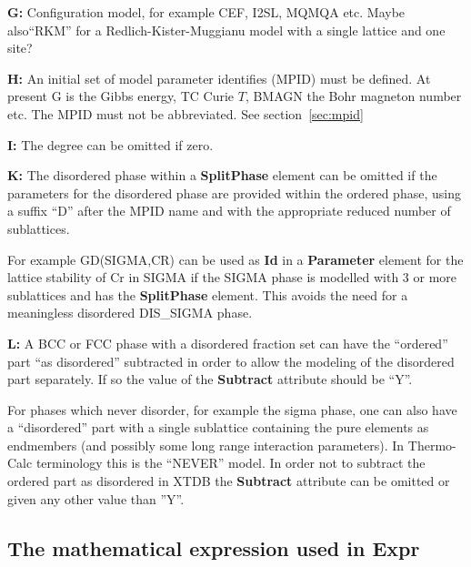\documentclass{article}
\begin{document}
\begin{description}
\item{\bf G:} Configuration model, for example CEF, I2SL, MQMQA etc.
  Maybe also``RKM'' for a Redlich-Kister-Muggianu model with a
  single lattice and one site?

\item{\bf H:} An initial set of model parameter identifies (MPID) must
  be defined.  At present G is the Gibbs energy, TC Curie $T$, BMAGN
  the Bohr magneton number etc.  The MPID must not be abbreviated.
  See section~\ref{sec:mpid}

\item{\bf I:} The degree can be omitted if zero.

\item{\bf K:} The disordered phase within a {\bf SplitPhase} element
  can be omitted if the parameters for the disordered phase are
  provided within the ordered phase, using a suffix ``D'' after the
  MPID name and with the appropriate reduced number of sublattices.
  
  For example GD(SIGMA,CR) can be used as {\bf Id} in a {\bf
    Parameter} element for the lattice stability of Cr in SIGMA if the
  SIGMA phase is modelled with 3 or more sublattices and has the {\bf
    SplitPhase} element.  This avoids the need for a meaningless
  disordered DIS\_SIGMA phase.

\item{\bf L:} A BCC or FCC phase with a disordered fraction set can
  have the ``ordered'' part ``as disordered'' subtracted in order to
  allow the modeling of the disordered part separately.  If so the
  value of the {\bf Subtract} attribute should be ``Y''.

  For phases which never disorder, for example the sigma phase, one
  can also have a ``disordered'' part with a single sublattice
  containing the pure elements as endmembers (and possibly some long
  range interaction parameters).  In Thermo-Calc terminology this is
  the ``NEVER'' model.  In order not to subtract the ordered part as
  disordered in XTDB the {\bf Subtract} attribute can be omitted or
  given any other value than ''Y''.

\end{description}

\subsection{The mathematical expression used in Expr}\label{sec:expr}
\end{document}
